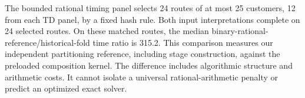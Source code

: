 The bounded rational timing panel selects 24 routes of at most 25 customers, 12 from each TD panel, by a fixed hash rule. Both input interpretations complete on 24 selected routes. On these matched routes, the median binary-rational-reference/historical-fold time ratio is 315.2. This comparison measures our independent partitioning reference, including stage construction, against the preloaded composition kernel. The difference includes algorithmic structure and arithmetic costs. It cannot isolate a universal rational-arithmetic penalty or predict an optimized exact solver.
